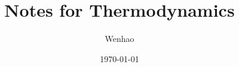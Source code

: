 \documentclass{article}
\begin{document}
\title{Notes for Thermodynamics}
\author{Wenhao}
\date{\today}
\maketitle

\tableofcontents

\newpage










\newpage
\begin{appendices}


    
\end{appendices}
\end{document}
